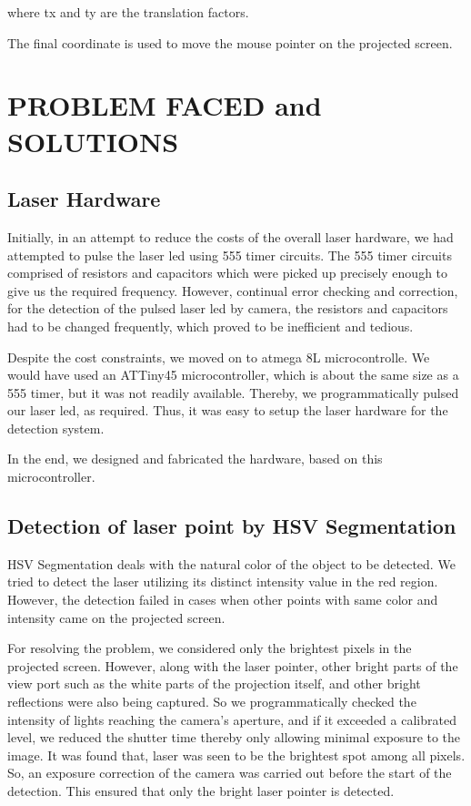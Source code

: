 \documentclass[12pt, a4paper]{article}
\begin{document}
where tx and ty are the translation factors.

The final coordinate is used to move the mouse pointer on the projected screen. 
\newpage
\section{PROBLEM FACED and SOLUTIONS}
\subsection{Laser Hardware}
Initially, in an attempt to reduce the costs of the overall laser hardware, we had attempted to pulse the laser led using 555 timer circuits. The 555 timer circuits comprised of resistors and capacitors which were picked up precisely enough to give us the required frequency. However, continual error checking and correction, for the detection of the pulsed laser led by camera, the resistors and capacitors had to be changed frequently, which proved to be inefficient and tedious.


Despite the cost constraints, we moved on to atmega 8L microcontrolle. We would have used an ATTiny45 microcontroller, which is about the same size as a 555 timer, but it was not readily available. Thereby, we programmatically pulsed our laser led, as required. Thus, it was easy to setup the laser hardware for the detection system.

In the end, we designed and fabricated the hardware, based on this microcontroller.


\subsection{Detection of laser point by HSV Segmentation}

HSV Segmentation deals with the natural color of the object to be detected. We tried to detect the laser utilizing its distinct intensity value in the red region. However, the detection failed in cases when other points with same color and intensity came on the projected screen.

For resolving the problem, we considered only the brightest pixels in the projected screen. However, along with the laser pointer, other bright parts of the view port such as the white parts of the projection itself, and other bright reflections were also being captured. So we programmatically checked the intensity of lights reaching the camera's aperture, and if it exceeded a calibrated level, we reduced the shutter time thereby only allowing minimal exposure to the image. It was found that, laser was seen to be the brightest spot among all pixels. So, an exposure correction of the camera was carried out before the start of the detection. This ensured that only the bright laser pointer is detected.
\newpage
\end{document}
